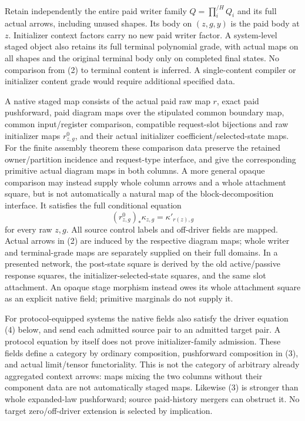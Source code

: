 \documentclass[11pt]{article}
\begin{document}
Retain independently the entire paid writer family $Q=\prod_i^{/H}Q_i$ and its full actual arrows, including unused shapes. Its body on $(z,g,y)$ is the paid body at $z$. Initializer context factors carry no new paid writer factor. A system-level staged object also retains its full terminal polynomial grade, with actual maps on all shapes and the original terminal body only on completed final states. No comparison from (2) to terminal content is inferred. A single-content compiler or initializer content grade would require additional specified data.

A native staged map consists of the actual paid raw map $r$, exact paid pushforward, paid diagram maps over the stipulated common boundary map, common input/register comparison, compatible request-slot bijections and raw initializer maps $r^0_{z,g}$, and their actual initializer coefficient/selected-state maps. For the finite assembly theorem these comparison data preserve the retained owner/partition incidence and request-type interface, and give the corresponding primitive actual diagram maps in both columns. A more general opaque comparison may instead supply whole column arrows and a whole attachment square, but is not automatically a natural map of the block-decomposition interface. It satisfies the full conditional equation
\[
          (r^0_{z,g})_*\kappa_{z,g}=\kappa'_{r(z),g}   \tag{3}
\]
for every raw $z,g$. All source control labels and off-driver fields are mapped. Actual arrows in (2) are induced by the respective diagram maps; whole writer and terminal-grade maps are separately supplied on their full domains. In a presented network, the post-state square is derived by the old active/passive response squares, the initializer-selected-state squares, and the same slot attachment. An opaque stage morphism instead owes its whole attachment square as an explicit native field; primitive marginals do not supply it.

For protocol-equipped systems the native fields also satisfy the driver equation (4) below, and send each admitted source pair to an admitted target pair. A protocol equation by itself does not prove initializer-family admission. These fields define a category by ordinary composition, pushforward composition in (3), and actual limit/tensor functoriality. This is not the category of arbitrary already aggregated context arrows: maps mixing the two columns without their component data are not automatically staged maps. Likewise (3) is stronger than whole expanded-law pushforward; source paid-history mergers can obstruct it. No target zero/off-driver extension is selected by implication.
\end{document}
